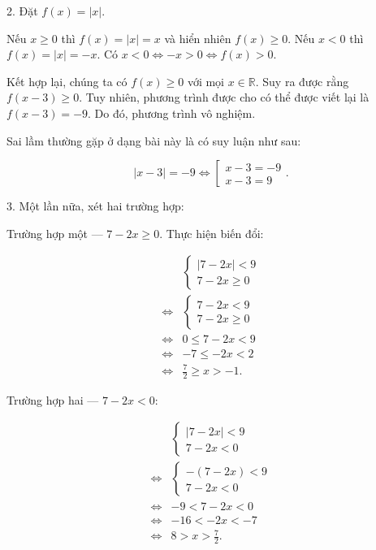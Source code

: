 2. Đặt $f(x) = |x|$.

Nếu \textcolor{colorEmphasisCyan}{$x \geq 0$} thì $f(x) = |x| = x$ và hiển nhiên $f(x) \geq 0$. Nếu \textcolor{colorEmphasis}{$x < 0$} thì $f(x) = |x| = -x$. Có $x < 0 \iff -x > 0 \iff f(x) > 0$.

Kết hợp lại, chúng ta có $f(x) \geq 0$ với mọi $x \in \mathbb{R}$. Suy ra được rằng $f(x - 3) \geq 0$. Tuy nhiên, phương trình được cho có thể được viết lại là $f(x - 3) = -9$. Do đó, phương trình vô nghiệm.

Sai lầm thường gặp ở dạng bài này là có suy luận như sau:

\begin{equation*}
   |x - 3| = -9 \iff \left[\begin{array}{l}
      x - 3 = -9 \\
      x - 3 = 9
   \end{array}\right..
\end{equation*}

3. Một lần nữa, xét hai trường hợp:

\textcolor{colorEmphasisCyan}{Trường hợp một --- $7 - 2x \geq 0$}. Thực hiện biến đổi:

\begin{align*}
   &\begin{cases}
      |7 - 2x| < 9 \\
      7 - 2x \geq 0
   \end{cases} \\
   \iff &\begin{cases}
      7 - 2x < 9 \\
      7 - 2x \geq 0
   \end{cases} \\
   \iff &0 \leq 7 - 2x < 9 \\
   \iff &-7 \leq -2x < 2 \\
   \iff &\frac{7}{2} \geq x > -1.
\end{align*}

\textcolor{colorEmphasis}{Trường hợp hai --- $7 - 2x < 0$}:

\begin{align*}
   &\begin{cases}
      |7 - 2x| < 9 \\
      7 - 2x < 0
   \end{cases} \\
   \iff &\begin{cases}
      - (7 - 2x) < 9 \\
      7 - 2x < 0
   \end{cases} \\
   \iff & -9 < 7 - 2x < 0 \\
   \iff & -16 < -2x < -7 \\
   \iff & 8 > x > \frac{7}{2}.
\end{align*}

